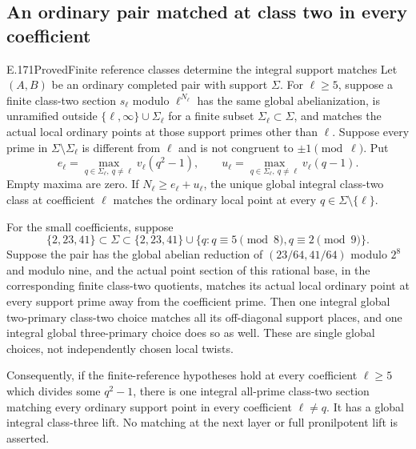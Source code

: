 \subsection{An ordinary pair matched at class two in every coefficient}

\begin{result}{E.171}{Proved}{Finite reference classes determine the integral support matches}
Let \((A,B)\) be an ordinary completed pair with support \(\Sigma\).
For \(\ell\ge5\), suppose a finite class-two section \(s_\ell\)
modulo \(\ell^{N_\ell}\) has the same global abelianization,
is unramified outside \(\{\ell,\infty\}\cup\Sigma_\ell\)
for a finite subset \(\Sigma_\ell\subset\Sigma\), and matches
the actual local ordinary points at those support primes other
than \(\ell\). Suppose every prime in
\(\Sigma\setminus\Sigma_\ell\) is different from \(\ell\)
and is not congruent to \(\pm1\pmod\ell\). Put
\[
 e_\ell=\max_{q\in\Sigma_\ell,\ q\ne\ell}v_\ell(q^2-1),
 \qquad
 u_\ell=\max_{q\in\Sigma_\ell,\ q\ne\ell}v_\ell(q-1).
 \tag{E.171.1}
\]
Empty maxima are zero. If \(N_\ell\ge e_\ell+u_\ell\),
the unique global integral class-two class at coefficient
\(\ell\) matches the ordinary local point at every
\(q\in\Sigma\setminus\{\ell\}\).

For the small coefficients, suppose
\[
 \{2,23,41\}\subset\Sigma\subset
 \{2,23,41\}\cup
 \{q:q\equiv5\pmod8, q\equiv2\pmod9\}.
 \tag{E.171.2}
\]
Suppose the pair has the global abelian reduction of
\((23/64,41/64)\) modulo \(2^8\) and modulo nine, and the
actual point section of this rational base, in the corresponding
finite class-two quotients, matches its actual local ordinary
point at every support prime away from the coefficient prime.
Then one integral global two-primary class-two choice matches
all its off-diagonal support places, and one integral global
three-primary choice does so as well. These are single global
choices, not independently chosen local twists.

Consequently, if the finite-reference hypotheses hold at every
coefficient \(\ell\ge5\) which divides some \(q^2-1\),
there is one integral all-prime class-two section matching every
ordinary support point in every coefficient \(\ell\ne q\).
It has a global integral class-three lift. No matching at the
next layer or full pronilpotent lift is asserted.
\end{result}
